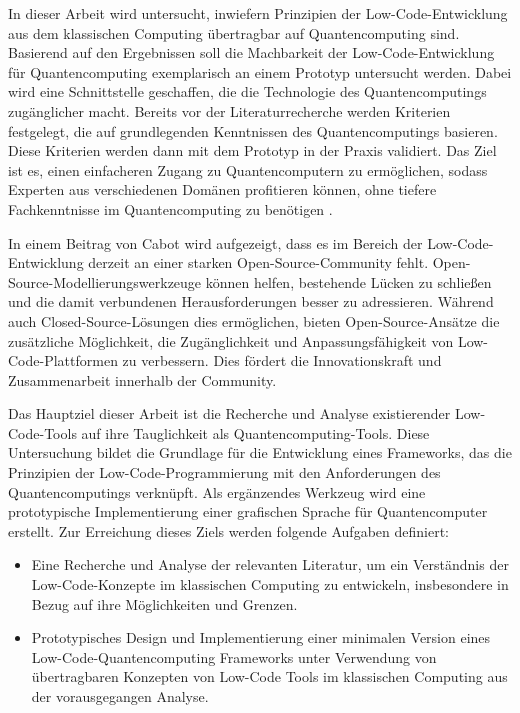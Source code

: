 In dieser Arbeit wird untersucht, inwiefern Prinzipien der Low-Code-Entwicklung aus dem
klassischen Computing übertragbar auf Quantencomputing sind. Basierend auf den Ergebnissen 
soll die Machbarkeit der Low-Code-Entwicklung für Quantencomputing exemplarisch an 
einem Prototyp untersucht werden. Dabei wird eine Schnittstelle geschaffen, die die 
Technologie des Quantencomputings zugänglicher macht. Bereits vor der Literaturrecherche 
werden Kriterien festgelegt, die auf grundlegenden Kenntnissen des Quantencomputings 
basieren. Diese Kriterien werden dann mit dem Prototyp in der Praxis validiert. Das 
Ziel ist es, einen einfacheren Zugang zu Quantencomputern zu ermöglichen, sodass 
Experten aus verschiedenen Domänen profitieren können, ohne tiefere Fachkenntnisse 
im Quantencomputing zu benötigen \cite{Motta2022}.

In einem Beitrag von Cabot \cite{Cabot_2020} wird aufgezeigt, dass es im Bereich der 
Low-Code-Entwicklung derzeit an einer starken Open-Source-Community fehlt. 
Open-Source-Modellierungswerkzeuge können helfen, bestehende Lücken zu schließen 
und die damit verbundenen Herausforderungen besser zu adressieren. Während auch 
Closed-Source-Lösungen dies ermöglichen, bieten Open-Source-Ansätze die zusätzliche 
Möglichkeit, die Zugänglichkeit und Anpassungsfähigkeit von Low-Code-Plattformen zu verbessern. 
Dies fördert die Innovationskraft und Zusammenarbeit innerhalb der Community.

Das Hauptziel dieser Arbeit ist die Recherche und Analyse existierender Low-Code-Tools 
auf ihre Tauglichkeit als Quantencomputing-Tools. Diese Untersuchung bildet die Grundlage 
für die Entwicklung eines Frameworks, das die Prinzipien der Low-Code-Programmierung 
mit den Anforderungen des Quantencomputings verknüpft. Als ergänzendes Werkzeug wird 
eine prototypische Implementierung einer grafischen Sprache für Quantencomputer erstellt. 
Zur Erreichung dieses Ziels werden folgende Aufgaben definiert:

\begin{itemize}
\item
  Eine Recherche und Analyse der relevanten Literatur, um ein
  Verständnis der Low-Code-Konzepte im klassischen Computing zu
  entwickeln, insbesondere in Bezug auf ihre Möglichkeiten und Grenzen.
\item
  Prototypisches Design und Implementierung einer minimalen Version
  eines Low-Code-Quantencomputing Frameworks unter Verwendung von
  übertragbaren Konzepten von Low-Code Tools im klassischen Computing
  aus der vorausgegangen Analyse.
\end{itemize}

